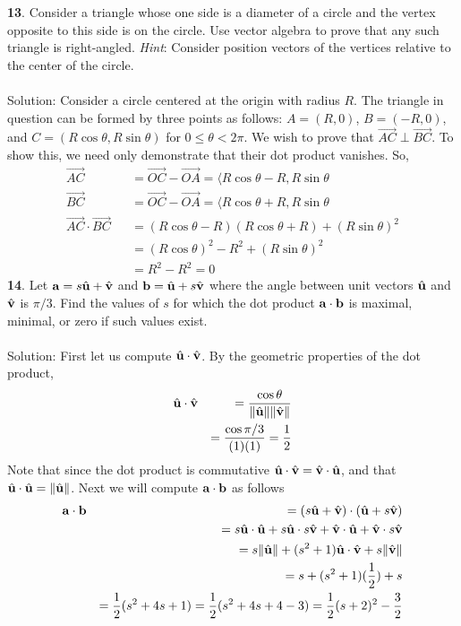 \documentclass[12pt]{amsbook}
\newcommand{\la}{\langle}
\begin{document}
{\small\bf 13}. Consider a triangle whose one side is a diameter
of a circle and the vertex opposite to this side is
on the circle. 
Use vector algebra to prove that any such triangle
is right-angled. {\it Hint}: Consider position vectors of 
the vertices relative to the center of the circle.\\
\\
{\sc Solution}:
Consider a circle centered at the origin with radius $R$. The triangle in question can be formed by three points as follows: $A=(R,0)$, $B=(-R,0)$, and $C=(R\cos\theta,R\sin\theta)$ for $0\leq \theta < 2\pi$. We wish to prove that $\overrightarrow{AC} \perp \overrightarrow{BC}$. To show this, we need only demonstrate that their dot product vanishes. So,
\begin{eqnarray*}
\overrightarrow{AC}&&=\overrightarrow{OC}-\overrightarrow{OA}=\la R\cos\theta -R , R\sin\theta \\
\overrightarrow{BC}&&=\overrightarrow{OC}-\overrightarrow{OA}=\la R\cos\theta +R, R\sin\theta 
\\
\overrightarrow{AC}\cdot\overrightarrow{BC}&&=(R\cos\theta -R)(R\cos\theta +R)+ (R\sin\theta)^2\\
&&=(R\cos\theta)^2-R^2+(R\sin\theta)^2\\
&&=R^2-R^2=0
\end{eqnarray*} 
{\small\bf 14}. Let ${\bf a}=s\hat{\bf u}+\hat{\bf v}$
and ${\bf b}=\hat{\bf u}+s\hat{\bf v}$ where 
the angle between unit vectors $\hat{\bf u}$ and $\hat{\bf v}$
is $\pi/3$. Find the values of $s$ for which the 
dot product ${\bf a}\cdot{\bf b}$ is maximal, minimal,
or zero if such values exist.\\
\\
{\sc Solution}: First let us compute $\hat{\bf u}\cdot\hat{\bf v}$. By the geometric properties of the dot product,
\begin{eqnarray*}
\hat{\bf u}\cdot\hat{\bf v}&&=\frac{\cos\theta}{\|\hat{\bf u}\|\|\hat{\bf v}\|}\\
&&=\frac{\cos\pi/3}{(1)(1)}=\frac 12
\end{eqnarray*}
Note that since the dot product is commutative $\hat{\bf u}\cdot\hat{\bf v}=\hat{\bf v}\cdot\hat{\bf u}$, and that $\hat{\bf u}\cdot\hat{\bf u}=\|\hat{\bf u}\|$. Next we will compute ${\bf a}\cdot{\bf b}$ as follows
\begin{eqnarray*}
{\bf a}\cdot{\bf b}&&=(s\hat{\bf u}+\hat{\bf v})\cdot(\hat{\bf u}+s\hat{\bf v})\\
&&=s\hat{\bf u}\cdot\hat{\bf u}+s\hat{\bf u}\cdot s\hat{\bf v}+\hat{\bf v}\cdot\hat{\bf u}+\hat{\bf v}\cdot s\hat{\bf v}\\
&&=s\|\hat{\bf u}\| +(s^2+1)\hat{\bf u}\cdot \hat{\bf v}+s\|\hat{\bf v}\|\\
&&=s +(s^2+1)(\frac 12)+s\\
&&=\frac 12(s^2+4s+1)=\frac 12(s^2+4s+4-3)=\frac 12(s+2)^2-\frac 32
\end{eqnarray*}
\end{document}
